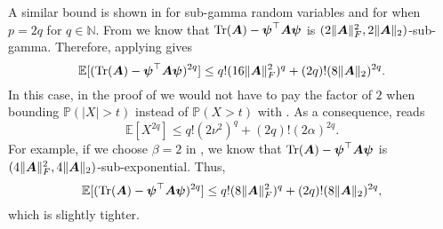 A similar bound is shown in \cite[Theorem 2.3]{boucheron-2013-concentration-inequalities} for sub-gamma random variables and for when $p = 2q$ for $q \in \mathbb{N}$. From \cite[Lemma 3]{cortinovis-2022-randomized-trace} we know that $\operatorname{Tr}(\boldsymbol{A}) - \boldsymbol{\psi}^{\top} \boldsymbol{A} \boldsymbol{\psi}$ is $(2 \lVert \boldsymbol{A} \rVert _F^2, 2\lVert \boldsymbol{A} \rVert _2)$-sub-gamma. Therefore, applying \cite[Theorem 2.3]{boucheron-2013-concentration-inequalities} gives
\begin{equation}
    \mathbb{E}[(\operatorname{Tr}(\boldsymbol{A}) - \boldsymbol{\psi}^{\top} \boldsymbol{A} \boldsymbol{\psi})^{2q}] \leq q! (16 \lVert \boldsymbol{A} \rVert _F^2)^q + (2q)! (8 \lVert \boldsymbol{A} \rVert _2)^{2q}.
\end{equation}
In this case, in the proof of  we would not have to pay the factor of $2$ when bounding $\mathbb{P}(|X| > t)$ instead of $\mathbb{P}(X > t)$ with \cite[Proposition 2.9]{wainwright-2019-highdimensional-statistics}. As a consequence,  reads
\begin{equation}
    \mathbb{E}[X^{2q}] \leq q! (2 \nu^2)^q + (2q)! (2 \alpha)^{2q}.
\end{equation}
For example, if we choose $\beta = 2$ in , we know that $\operatorname{Tr}(\boldsymbol{A}) - \boldsymbol{\psi}^{\top} \boldsymbol{A} \boldsymbol{\psi}$ is $(4 \lVert \boldsymbol{A} \rVert _F^2, 4 \lVert \boldsymbol{A} \rVert _2)$-sub-exponential. Thus,
\begin{equation}
    \mathbb{E}[(\operatorname{Tr}(\boldsymbol{A}) - \boldsymbol{\psi}^{\top} \boldsymbol{A} \boldsymbol{\psi})^{2q}] \leq q! (8 \lVert \boldsymbol{A} \rVert _F^2)^q + (2q)! (8 \lVert \boldsymbol{A} \rVert _2)^{2q},
\end{equation}
which is slightly tighter.

